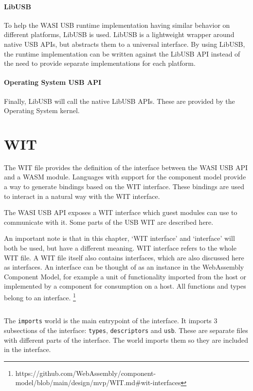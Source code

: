 \paragraph{LibUSB} To help the WASI USB runtime implementation having similar behavior on different platforms, LibUSB is used. LibUSB is a lightweight wrapper around native USB APIs, but abstracts them to a universal interface. By using LibUSB, the runtime implementation can be written against the LibUSB API instead of the need to provide separate implementations for each platform.

\paragraph{Operating System USB API} Finally, LibUSB will call the native LibUSB APIs. These are provided by the Operating System kernel.

\section{\acrfull{WIT}}
The WIT file provides the definition of the interface between the WASI USB API and a WASM module. Languages with support for the component model provide a way to generate bindings based on the WIT interface. These bindings are used to interact in a natural way with the WIT interface.

The WASI USB API exposes a WIT interface which guest modules can use to communicate with it. Some parts of the USB WIT are described here.

An important note is that in this chapter, `WIT interface' and `interface' will both be used, but have a different meaning.
WIT interface refers to the whole WIT file.
A WIT file itself also contains interfaces, which are also discussed here as interfaces. An interface can be thought of as an instance in the WebAssembly Component Model, for example a unit of functionality imported from the host or implemented by a component for consumption on a host. All functions and types belong to an interface. \footnote{https://github.com/WebAssembly/component-model/blob/main/design/mvp/WIT.md\#wit-interfaces}

\inputminted{yaml}{wit/world.wit}

The \texttt{imports} world is the main entrypoint of the interface. It imports 3 subsections of the interface: \texttt{types}, \texttt{descriptors} and \texttt{usb}. These are separate files with different parts of the interface. The world imports them so they are included in the interface.

